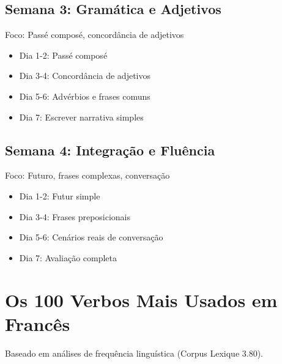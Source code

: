 \documentclass[a4paper,12pt]{article}
\begin{document}
\subsection{Semana 3: Gramática e Adjetivos}
Foco: Passé composé, concordância de adjetivos \\
\begin{itemize}
    \item Dia 1-2: Passé composé
    \item Dia 3-4: Concordância de adjetivos
    \item Dia 5-6: Advérbios e frases comuns
    \item Dia 7: Escrever narrativa simples
\end{itemize}

\subsection{Semana 4: Integração e Fluência}
Foco: Futuro, frases complexas, conversação \\
\begin{itemize}
    \item Dia 1-2: Futur simple
    \item Dia 3-4: Frases preposicionais
    \item Dia 5-6: Cenários reais de conversação
    \item Dia 7: Avaliação completa
\end{itemize}

\section{Os 100 Verbos Mais Usados em Francês}
Baseado em análises de frequência linguística (Corpus Lexique 3.80).
\end{document}
